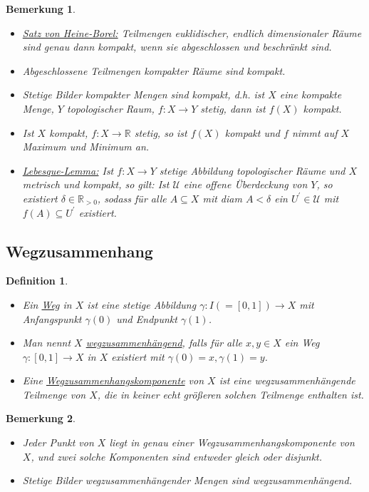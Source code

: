 \documentclass[a4paper,11pt,notitlepage]{report}
\newtheorem{definition}{Definition}[chapter]
\newtheorem{remark}{Bemerkung}[chapter]
\newcommand{\R}{{\ensuremath{\mathbb{R}}}}
\begin{document}
\begin{remark}
	\begin{itemize}
		\item \underline{Satz von Heine-Borel:} Teilmengen euklidischer, endlich dimensionaler Räume sind genau dann kompakt, wenn sie abgeschlossen und beschränkt sind.
		\item Abgeschlossene Teilmengen kompakter Räume sind kompakt.
		\item Stetige Bilder kompakter Mengen sind kompakt, d.h. ist $X$ eine kompakte Menge, $Y$ topologischer Raum, $f \colon X \rightarrow Y$ stetig, dann ist $f(X)$ kompakt.
		\item Ist $X$ kompakt, $f \colon X \rightarrow \R$ stetig, so ist $f(X)$ kompakt und $f$ nimmt auf $X$ Maximum und Minimum an.
		\item \underline{Lebesque-Lemma:} Ist $f \colon X \rightarrow Y$ stetige Abbildung topologischer Räume und $X$ metrisch und kompakt, so gilt:
		\newline
			Ist $\mathcal{U}$ eine offene Überdeckung von $Y$, so existiert $\delta \in \R_{>0}$, sodass für alle $A \subseteq X$ mit diam $A < \delta$ ein $U^\prime \in \mathcal{U}$ mit $f(A) \subseteq U^\prime$ existiert.
	\end{itemize}
\end{remark}

\subsection{Wegzusammenhang}
\begin{definition}
	\begin{itemize}
		\item Ein \underline{Weg} in $X$ ist eine stetige Abbildung $\gamma \colon I(=[0,1]) \rightarrow X$ mit Anfangspunkt $\gamma(0)$ und Endpunkt $\gamma(1)$.	
		\item Man nennt $X$ \underline{wegzusammenhängend}, falls für alle $x,y \in X$ ein Weg $\gamma \colon [0,1] \rightarrow X$ in $X$ existiert mit $\gamma(0)=x, \gamma(1)=y$.
		\item Eine \underline{Wegzusammenhangskomponente} von $X$ ist eine wegzusammenhängende Teilmenge von $X$, die in keiner echt größeren solchen Teilmenge enthalten ist.
	\end{itemize}
\end{definition}

\begin{remark}
	\begin{itemize}
		\item Jeder Punkt von $X$ liegt in genau einer Wegzusammenhangskomponente von $X$, und zwei solche Komponenten sind entweder gleich oder disjunkt.
		\item Stetige Bilder wegzusammenhängender Mengen sind wegzusammenhängend.
	\end{itemize}
\end{remark}
\end{document}
